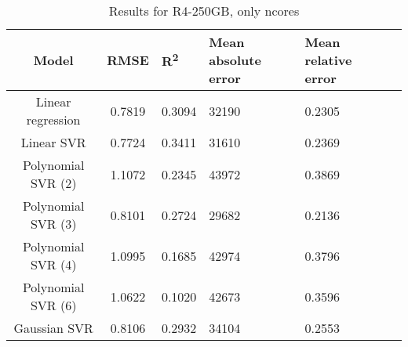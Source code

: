 \begin{table}[H]
\centering
\begin{adjustbox}{center}
\begin{tabular}{c | c M{1.2cm} M{2.5cm} M{2.5cm} M{1.8cm}}
Model & RMSE & R\textsuperscript{2} & Mean absolute error & Mean relative error \tabularnewline
\hline
Linear regression & 0.7819 & 0.3094 &  32190 & 0.2305 \\
Linear SVR & 0.7724 & 0.3411 &  31610 & 0.2369 \\
Polynomial SVR (2) & 1.1072 & 0.2345 &  43972 & 0.3869 \\
Polynomial SVR (3) & 0.8101 & 0.2724 &  29682 & 0.2136 \\
Polynomial SVR (4) & 1.0995 & 0.1685 &  42974 & 0.3796 \\
Polynomial SVR (6) & 1.0622 & 0.1020 &  42673 & 0.3596 \\
Gaussian SVR & 0.8106 & 0.2932 &  34104 & 0.2553 \\
\end{tabular}
\end{adjustbox}
\\
\caption{Results for R4-250GB, only ncores}
\label{tab:only_1_linear_R4_250}
\end{table}

